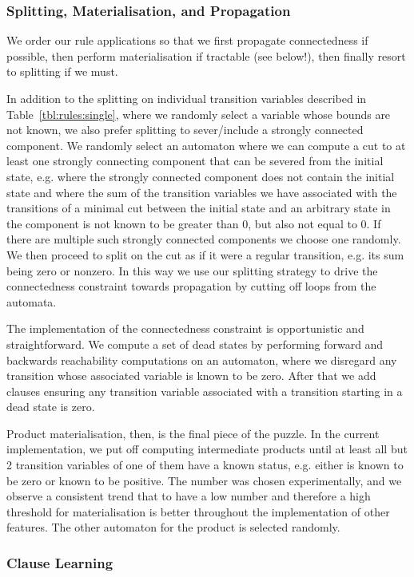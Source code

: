 \documentclass[acmsmall,review,anonymous,screen]{acmart}\settopmatter{printfolios=true,printccs=false,printacmref=true}
\theoremstyle{definition}
\begin{document}
\subsubsection{Splitting, Materialisation, and Propagation}

We order our rule applications so that we first propagate connectedness if
possible, then perform materialisation if tractable (see below!), then finally
resort to splitting if we must.

In addition to the splitting on individual transition variables described in Table~\ref{tbl:rules:single}, where we randomly select a variable whose bounds are not known, we also prefer splitting to sever/include a strongly connected component. We randomly select an automaton where we can compute a cut to at least one strongly connecting component that can be severed from the initial state, e.g. where the strongly connected component does not contain the initial state and where the sum of the transition variables we have associated with the transitions of a minimal cut between the initial state and an arbitrary state in the component is not known to be greater than 0, but also not equal to 0. If there are multiple such strongly connected components we choose one randomly. We then proceed to split on the cut as if it were a regular transition, e.g. its sum being zero or nonzero. In this way we use our splitting strategy to drive the connectedness constraint towards propagation by cutting off loops from the automata.

The implementation of the connectedness constraint is opportunistic and straightforward. We compute a set of dead states by performing forward and backwards reachability computations on an automaton, where we disregard any transition whose associated variable is known to be zero. After that we add clauses ensuring any transition variable associated with a transition starting in a dead state is zero.

Product materialisation, then, is the final piece of the puzzle. In the current implementation, we put off computing intermediate products until at least all but 2 transition variables of one of them have a known status, e.g. either is known to be zero or known to be positive. The number was chosen experimentally, and we observe a consistent trend that to have a low number and therefore a high threshold for materialisation is better throughout the implementation of other features. The other automaton for the product is selected randomly.

\subsubsection{Clause Learning}
\end{document}
